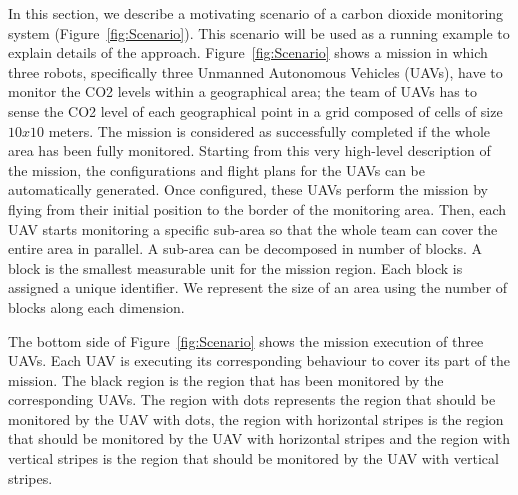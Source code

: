 \documentclass[journal]{IEEEtran}
\theoremstyle{definition}
\newcommand\patrizio[1]{\nb{Patrizio}{#1}}
\begin{document}
In this section, we describe  a motivating scenario of a carbon dioxide monitoring system (Figure~\ref{fig:Scenario}). This scenario will be used as a running example to explain details of the approach.
Figure~\ref{fig:Scenario} shows a mission in which three robots, specifically three Unmanned Autonomous Vehicles (UAVs), have to monitor the CO2 levels within a geographical area; the team of UAVs has to sense the CO2 level of each geographical point in a grid composed of cells of size $10x10$ meters. The mission is considered as successfully completed if the whole area has been fully monitored. %
Starting from this very high-level description of the mission, the configurations and flight plans for the  UAVs can be automatically generated. Once configured, these UAVs perform the mission by flying from their initial position to the border of the monitoring area. Then, each UAV starts monitoring a specific sub-area so that the whole team can cover the entire area in parallel. A sub-area can be decomposed in number of blocks.
 A block is the smallest measurable unit for the mission region. Each block is assigned a unique identifier. We represent the size of an area using the number of blocks along each dimension. 

The bottom side of Figure~\ref{fig:Scenario} shows the mission execution of three UAVs. Each UAV is executing its corresponding behaviour to cover  its part of the mission. The black region is the region that has been monitored by the corresponding UAVs.
The region with dots represents the region that should be monitored by the UAV with dots, the region with horizontal stripes is the region that should be monitored by the UAV  with horizontal stripes and the  region with vertical stripes is the region that should be monitored by the UAV with vertical stripes. 
\end{document}
